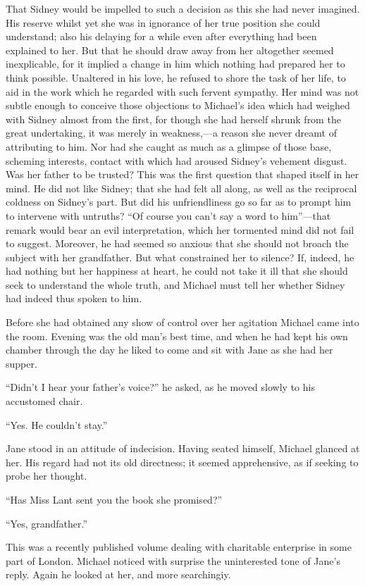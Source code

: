 That Sidney would be impelled to such a decision as this she had never
imagined. His reserve whilst yet she was in ignorance of her true
position she could understand; also his delaying for a while even after
everything had been explained to her. But that he should draw away from
her altogether seemed inexplicable, for it implied a change in him which
nothing had prepared her to think possible. Unaltered in his love, he
refused to shore the task of her life, to aid in the work which he
regarded with such fervent sympathy. Her mind was not subtle enough to
conceive those objections to Michael's idea {}which had weighed with
Sidney almost from the first, for though she had herself shrunk from the
great undertaking, it was merely in weakness,---a reason she never
dreamt of attributing to him. Nor had she caught as much as a glimpse of
those base, scheming interests, contact with which had aroused Sidney's
vehement disgust. Was her father to be trusted? This was the first
question that shaped itself in her mind. He did not like Sidney; that
she had felt all along, as well as the reciprocal coldness on Sidney's
part. But did his unfriendliness go so far as to prompt him to intervene
with untruths? ``Of course you can't say a word to him''---that remark
would bear an evil interpretation, which her tormented mind did not fail
to suggest. Moreover, he had seemed so anxious that she should not
broach the subject with her grandfather. But what constrained her to
silence? If, indeed, he had nothing but her happiness at heart, he could
not take it ill that she should seek to understand the whole truth, and
Michael must tell her whether Sidney had indeed thus spoken to him.

Before she had obtained any show of control over her agitation Michael
came into the room. {}Evening was the old man's best time, and when he
had kept his own chamber through the day he liked to come and sit with
Jane as she had her supper.

``Didn't I hear your father's voice?'' he asked, as he moved slowly to
his accustomed chair.

``Yes. He couldn't stay.''

Jane stood in an attitude of indecision. Having seated himself, Michael
glanced at her. His regard had not its old directness; it seemed
apprehensive, as if seeking to probe her thought.

``Has Miss Lant sent you the book she promised?''

``Yes, grandfather.''

This was a recently published volume dealing with charitable enterprise
in some part of London. Michael noticed with surprise the uninterested
tone of Jane's reply. Again he looked at her, and more searchingiy.

